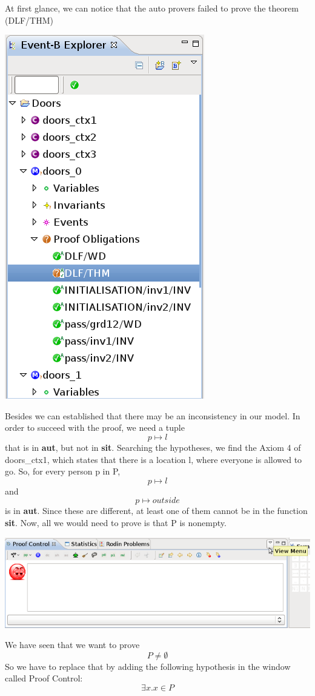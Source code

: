 At first glance, we can notice that the auto provers failed to prove the theorem (\textsf{DLF/THM})
\begin{center}
	\includegraphics[]{img/tutorial/tut_10_proversfailed.png}
\end{center}

Besides we can established that there may be an inconsistency in our model.
In order to succeed with the proof, we need a tuple \[ p \mapsto l \]that is in \textbf{aut}, but not in \textbf{sit}. Searching the hypotheses, we find the Axiom 4 of doors\_ctx1, which states that there is a location l, where everyone is allowed to go. So, for every person p in P, \[p \mapsto l \] and \[p \mapsto outside\] is in \textbf{aut}. Since these are different, at least one of them cannot be in the function \textbf{sit}. Now, all we would need to prove is that P is nonempty. 

\begin{center}
	\includegraphics[]{img/tutorial/tut_10_view_menu.png}
\end{center}
We have seen that we want to prove  
\[
P \neq \emptyset
\]So we have to replace that by adding the following hypothesis in the window called \textsf{Proof Control}:
\[
\exists x.x \in P 
\]


